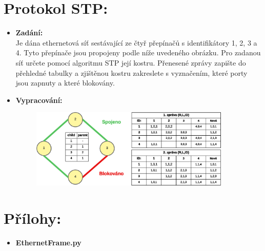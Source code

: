 \documentclass[10pt, a4paper]{article}%
\begin{document}
	\section*{\large{\textbf{ Protokol STP:}}}
		\begin{itemize}[label={}]
			\item \textbf{Zadání:}\\
			Je dána ethernetová síť sestávající ze čtyř přepínačů s identifikátory 1, 2, 3 a 4. Tyto přepínače jsou 
			propojeny podle níže uvedeného obrázku. Pro zadanou síť určete pomocí algoritmu STP její kostru. 
			Přenesené zprávy zapište do přehledné tabulky a zjištěnou kostru zakreslete s vyznačením, které porty jsou zapnuty a které blokovány.

			\item \textbf{Vypracování:}\\
			\begin{figure}[ht!]
				\centering
				\includegraphics[width = 0.9\textwidth]{STP.eps}
			\end{figure}
		\end{itemize}

	\clearpage
	\section*{\large{\textbf{Přílohy:}}}

	\begin{itemize}[label={}]
		\item \textbf{EthernetFrame.py}\\
		
		\clearpage
	\end{itemize}
\end{document}
